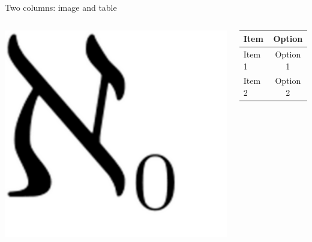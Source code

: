 \documentclass[
  11pt,
  ignorenonframetext,
  aspectratio=169,
  aspectratio=169]{beamer}
\begin{document}
\begin{frame}{Two columns: image and table}
\protect\hypertarget{two-columns-image-and-table}{}
\begin{columns}[T]
\begin{column}{0.48\textwidth}
\includegraphics[width=\textwidth,height=0.5\textheight]{img/aleph0.png}
\end{column}

\begin{column}{0.48\textwidth}
\begin{longtable}[]{@{}lc@{}}
\toprule\noalign{}
\textbf{Item} & \textbf{Option} \\
\midrule\noalign{}
\endhead
\bottomrule\noalign{}
\endlastfoot
Item 1 & Option 1 \\
Item 2 & Option 2 \\
\end{longtable}
\end{column}
\end{columns}
\end{frame}
\end{document}

